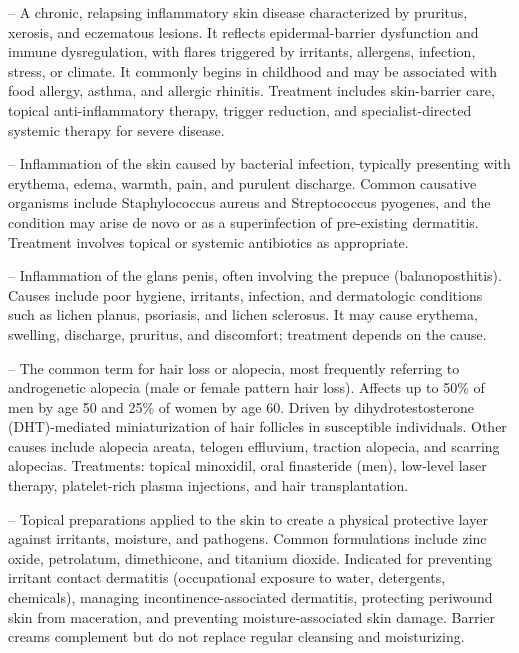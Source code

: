 -- A chronic, relapsing inflammatory skin disease characterized by pruritus, xerosis, and eczematous lesions. It reflects epidermal-barrier dysfunction and immune dysregulation, with flares triggered by irritants, allergens, infection, stress, or climate. It commonly begins in childhood and may be associated with food allergy, asthma, and allergic rhinitis. Treatment includes skin-barrier care, topical anti-inflammatory therapy, trigger reduction, and specialist-directed systemic therapy for severe disease.

-- Inflammation of the skin caused by bacterial infection, typically presenting with erythema, edema, warmth, pain, and purulent discharge. Common causative organisms include Staphylococcus aureus and Streptococcus pyogenes, and the condition may arise de novo or as a superinfection of pre-existing dermatitis. Treatment involves topical or systemic antibiotics as appropriate.

-- Inflammation of the glans penis, often involving the prepuce (balanoposthitis). Causes include poor hygiene, irritants, infection, and dermatologic conditions such as lichen planus, psoriasis, and lichen sclerosus. It may cause erythema, swelling, discharge, pruritus, and discomfort; treatment depends on the cause.

-- The common term for hair loss or alopecia, most frequently referring to androgenetic alopecia (male or female pattern hair loss). Affects up to 50\% of men by age 50 and 25\% of women by age 60. Driven by dihydrotestosterone (DHT)-mediated miniaturization of hair follicles in susceptible individuals. Other causes include alopecia areata, telogen effluvium, traction alopecia, and scarring alopecias. Treatments: topical minoxidil, oral finasteride (men), low-level laser therapy, platelet-rich plasma injections, and hair transplantation.

-- Topical preparations applied to the skin to create a physical protective layer against irritants, moisture, and pathogens. Common formulations include zinc oxide, petrolatum, dimethicone, and titanium dioxide. Indicated for preventing irritant contact dermatitis (occupational exposure to water, detergents, chemicals), managing incontinence-associated dermatitis, protecting periwound skin from maceration, and preventing moisture-associated skin damage. Barrier creams complement but do not replace regular cleansing and moisturizing.

